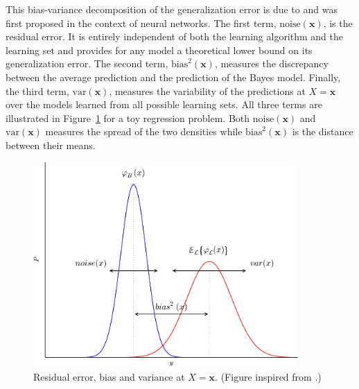This bias-variance decomposition of the generalization error is due to
\citet{geman:1992} and was first proposed in the context of neural networks.
The first term, $\text{noise}(\mathbf{x})$, is the residual error. It is
entirely independent of both the learning algorithm and the learning set and
provides for any model a theoretical lower bound on its generalization error.
The second term, $\text{bias}^2(\mathbf{x})$, measures the discrepancy between
the average prediction and the prediction of the Bayes model. Finally, the
third term, $\text{var}(\mathbf{x})$, measures the variability of the
predictions at $X=\mathbf{x}$ over the models learned from all possible
learning sets. All three terms are illustrated in Figure~\ref{fig:bias-variance}
for a toy regression problem. Both $\text{noise}(\mathbf{x})$ and
$\text{var}(\mathbf{x})$ measures the spread of the two densities while
$\text{bias}^2(\mathbf{x})$ is the distance between their means.

\begin{figure}
    \centering
    \includegraphics[width=0.9\textwidth]{figures/ch4_bias_variance.pdf}
    \caption{Residual error, bias and variance at $X=\mathbf{x}$. (Figure inspired from \citep{geurts:2002}.)}
    \label{fig:bias-variance}
\end{figure}



